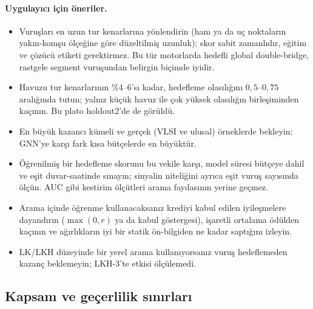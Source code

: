 \documentclass[pdflatex,sn-basic]{sn-jnl}
\begin{document}
\paragraph{Uygulayıcı için öneriler.}
\begin{itemize}
\item Vuruşları en uzun tur kenarlarına yönlendirin (ham ya da uç noktaların yakın-komşu ölçeğine
göre düzeltilmiş uzunluk); skor sabit zamanlıdır, eğitim ve çözücü etiketi gerektirmez. Bu tür
motorlarda hedefli global double-bridge, rastgele segment vuruşundan belirgin biçimde iyidir.
\item Havuzu tur kenarlarının \%4--6'sı kadar, hedefleme olasılığını $0{,}5$--$0{,}75$ aralığında
tutun; yalnız küçük havuz ile çok yüksek olasılığın birleşiminden kaçının. Bu plato holdout2'de de
görüldü.
\item En büyük kazancı kümeli ve gerçek (VLSI ve ulusal) örneklerde bekleyin; GNN'ye karşı fark
kısa bütçelerde en büyüktür.
\item Öğrenilmiş bir hedefleme skorunu bu vekile karşı, model süresi bütçeye dahil ve eşit
duvar-saatinde sınayın; sinyalin niteliğini ayrıca eşit vuruş sayısında ölçün. AUC gibi kestirim
ölçütleri arama faydasının yerine geçmez.
\item Arama içinde öğrenme kullanacaksanız krediyi kabul edilen iyileşmelere dayandırın
($\max(0,r)$ ya da kabul göstergesi), işaretli ortalama ödülden kaçının ve ağırlıkların iyi bir
statik ön-bilgiden ne kadar saptığını izleyin.
\item LK/LKH düzeyinde bir yerel arama kullanıyorsanız vuruş hedeflemeden kazanç beklemeyin; LKH-3'te
etkisi ölçülemedi.
\end{itemize}

\subsection{Kapsam ve geçerlilik sınırları}\label{sec:tartisma-sinir}
\end{document}
